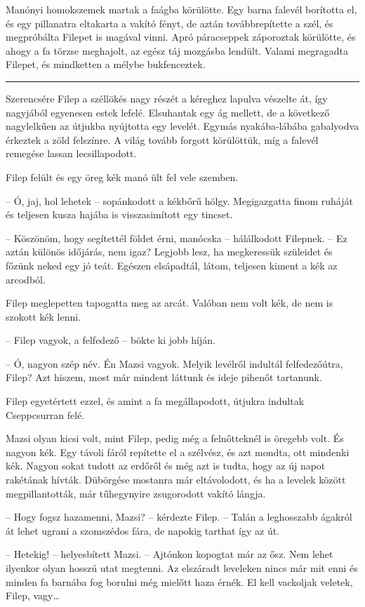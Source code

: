 \documentclass[10pt]{memoir}
\renewcommand{\pfbreakdisplay}{\bigskip \ding{166} \bigskip}
\newcommand{\secbreak}{\fancybreak{\pfbreakdisplay}\indent}
\begin{document}
Manónyi homokszemek martak a faágba körülötte. Egy barna falevél borította el,
és egy pillanatra eltakarta a vakító fényt, de aztán továbbrepítette a szél, és
megpróbálta Filepet is magával vinni. Apró páracseppek záporoztak körülötte, és
ahogy a fa törzse meghajolt, az egész táj mozgásba lendült. Valami megragadta
Filepet, és mindketten a mélybe bukfenceztek.

\secbreak

Szerencsére Filep a széllökés nagy részét a kéreghez lapulva vészelte át, így
nagyjából egyenesen estek lefelé. Elsuhantak egy ág mellett, de a következő
nagylelkűen az útjukba nyújtotta egy levelét. Egymás nyakába-lábába gabalyodva
érkeztek a zöld felszínre. A világ tovább forgott körülöttük, míg a falevél
remegése lassan lecsillapodott.

Filep felült és egy öreg kék manó ült fel vele szemben.

-- Ó, jaj, hol lehetek -- sopánkodott a kékbőrű hölgy. Megigazgatta finom
ruháját és teljesen kusza hajába is visszasimított egy tincset.

-- Köszönöm, hogy segítettél földet érni, manócska -- hálálkodott Filepnek.
-- Ez aztán különös időjárás, nem igaz? Legjobb lesz, ha megkeressük szüleidet
és főzünk neked egy jó teát. Egészen elsápadtál, látom, teljesen kiment a kék
az arcodból.

Filep meglepetten tapogatta meg az arcát. Valóban nem volt kék, de nem is
szokott kék lenni.

-- Filep vagyok, a felfedező -- bökte ki jobb híján.

-- Ó, nagyon szép név. Én Mazsi vagyok. Melyik levélről indultál
felfedezőútra, Filep? Azt hiszem, most már mindent láttunk és ideje pihenőt
tartanunk.

Filep egyetértett ezzel, és amint a fa megállapodott, útjukra indultak
Cseppcsurran felé.

Mazsi olyan kicsi volt, mint Filep, pedig még a felnőtteknél is öregebb volt.
És nagyon kék. Egy távoli fáról repítette el a szélvész, és azt mondta, ott
mindenki kék. Nagyon sokat tudott az erdőről és még azt is tudta, hogy az új
napot rakétának hívták. Dübörgése mostanra már eltávolodott, és ha a levelek
között megpillantották, már tűhegynyire zsugorodott vakító lángja.

-- Hogy fogsz hazamenni, Mazsi? -- kérdezte Filep. -- Talán a leghosszabb
ágakról át lehet ugrani a szomszédos fára, de napokig tarthat így az út.

-- Hetekig! -- helyesbített Mazsi. -- Ajtónkon kopogtat már az ősz. Nem
lehet ilyenkor olyan hosszú utat megtenni. Az elszáradt leveleken nincs már mit
enni és minden fa barnába fog borulni még mielőtt haza érnék. El kell vackoljak
veletek, Filep, vagy\dots
\end{document}

